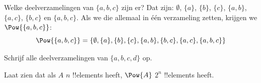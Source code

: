 \documentclass[openany]{memoir}
\begin{document}
\begin{ex}
Welke deelverzamelingen van $\{ a, b, c \}$ zijn er? Dat zijn:
$\emptyset$, $\{a \}$, $\{b\}$, $\{c\}$, $\{a, b\}$, $\{a, c\}$,
$\{b, c\}$ en $\{a, b, c\}$. Als we die allemaal in één verzameling
zetten, krijgen we $\Pow{\{a,b,c\}}$:
\[
\Pow{\{ a, b, c \}} = \{\emptyset, \{a \}, \{b\}, \{c\}, \{a, b\},
\{b, c\}, \{a, c\}, \{a, b, c\}\}
\]
\end{ex}

\begin{prob}
Schrijf alle deelverzamelingen van $\{a, b, c, d\}$ op.
\end{prob}

\begin{prob}
Laat zien dat als $A$ $n$ !!{element}s heeft, $\Pow{A}$ $2^n$
!!{element}s heeft.
\end{prob}
\endgroup

\begingroup
\def\olfilename{OLP-0007}
\def\olfilepath{content/sets-functions-relations/sets/}
\hypertarget{unit-OLP-0007}{}



\end{document}
